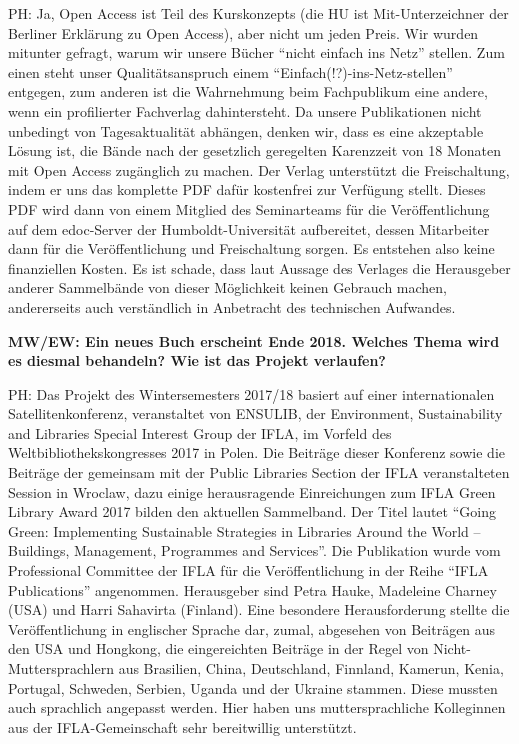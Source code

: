 \documentclass[a4paper,
fontsize=11pt,
oneside,
numbers=noperiodatend,
parskip=half-,
bibliography=totoc,
final
]{scrartcl}
\begin{document}
PH: Ja, Open Access ist Teil des Kurskonzepts (die HU ist
Mit-Unterzeichner der Berliner Erklärung zu Open Access), aber nicht um
jeden Preis. Wir wurden mitunter gefragt, warum wir unsere Bücher
\enquote{nicht einfach ins Netz} stellen. Zum einen steht unser
Qualitätsanspruch einem \enquote{Einfach(!?)-ins-Netz-stellen} entgegen,
zum anderen ist die Wahrnehmung beim Fachpublikum eine andere, wenn ein
profilierter Fachverlag dahintersteht. Da unsere Publikationen nicht
unbedingt von Tagesaktualität abhängen, denken wir, dass es eine
akzeptable Lösung ist, die Bände nach der gesetzlich geregelten
Karenzzeit von 18 Monaten mit Open Access zugänglich zu machen. Der
Verlag unterstützt die Freischaltung, indem er uns das komplette PDF
dafür kostenfrei zur Verfügung stellt. Dieses PDF wird dann von einem
Mitglied des Seminarteams für die Veröffentlichung auf dem edoc-Server
der Humboldt-Universität aufbereitet, dessen Mitarbeiter dann für die
Veröffentlichung und Freischaltung sorgen. Es entstehen also keine
finanziellen Kosten. Es ist schade, dass laut Aussage des Verlages die
Herausgeber anderer Sammelbände von dieser Möglichkeit keinen Gebrauch
machen, andererseits auch verständlich in Anbetracht des technischen
Aufwandes.

\textbf{MW/EW: Ein neues Buch erscheint Ende 2018. Welches Thema wird es
diesmal behandeln? Wie ist das Projekt verlaufen?}

PH: Das Projekt des Wintersemesters 2017/18 basiert auf einer
internationalen Satellitenkonferenz, veranstaltet von ENSULIB, der
Environment, Sustainability and Libraries Special Interest Group der
IFLA, im Vorfeld des Weltbibliothekskongresses 2017 in Polen. Die
Beiträge dieser Konferenz sowie die Beiträge der gemeinsam mit der
Public Libraries Section der IFLA veranstalteten Session in Wroclaw,
dazu einige herausragende Einreichungen zum IFLA Green Library Award
2017 bilden den aktuellen Sammelband. Der Titel lautet \enquote{Going
Green: Implementing Sustainable Strategies in Libraries Around the World
-- Buildings, Management, Programmes and Services}. Die Publikation
wurde vom Professional Committee der IFLA für die Veröffentlichung in
der Reihe \enquote{IFLA Publications} angenommen. Herausgeber sind Petra
Hauke, Madeleine Charney (USA) und Harri Sahavirta (Finland). Eine
besondere Herausforderung stellte die Veröffentlichung in englischer
Sprache dar, zumal, abgesehen von Beiträgen aus den USA und Hongkong,
die eingereichten Beiträge in der Regel von Nicht-Muttersprachlern aus
Brasilien, China, Deutschland, Finnland, Kamerun, Kenia, Portugal,
Schweden, Serbien, Uganda und der Ukraine stammen. Diese mussten auch
sprachlich angepasst werden. Hier haben uns muttersprachliche
Kolleginnen aus der IFLA-Gemeinschaft sehr bereitwillig unterstützt.
\end{document}

